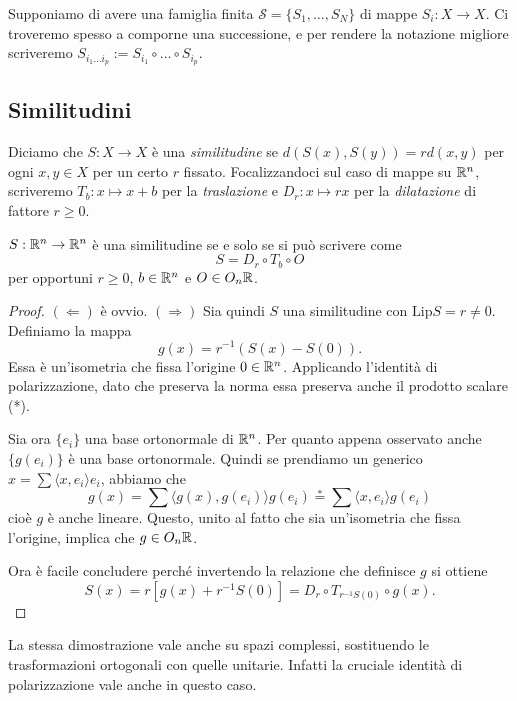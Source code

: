 	Supponiamo di avere una famiglia finita $\mathcal S = \{S_{1},\dots, S_{N}\}$ di mappe $S_{i}:X\to X$. Ci troveremo spesso a comporne una successione, e per rendere la notazione migliore scriveremo $S_{i_{1}\dots i_{p}} := S_{i_{1}}\circ \dots \circ S_{i_{p}}$.


\subsection{Similitudini}

	Diciamo che $S:X\to X$ è una \emph{similitudine} se $d(S(x), S(y)) = rd(x,y)$ per ogni $x,y\in X$ per un certo $r$ fissato. Focalizzandoci sul caso di mappe su $\mathbb{R}^{n}$, scriveremo $T_{b}: x\mapsto x + b$ per la \emph{traslazione} e $D_{r}: x\mapsto rx$ per la \emph{dilatazione} di fattore $r\geq0$.
	
\begin{proposizione}
	$S:\mathbb{R}^{n}\to\mathbb{R}^{n}$ è una similitudine se e solo se si può scrivere come $$S = D_{r}\circ T_{b}\circ O$$ per opportuni $r\geq0$, $b\in\mathbb{R}^{n}$ e $O\in O_{n}\mathbb{R}$.
\end{proposizione}
\begin{proof}
	$(\Leftarrow)$ è ovvio. 
	$(\Rightarrow)$ Sia quindi $S$ una similitudine con $\text{Lip}S = r \neq 0$. Definiamo la mappa $$g(x) = r^{-1}(S(x)-S(0)).$$
	Essa è un'isometria che fissa l'origine $0\in\mathbb{R}^{n}$. Applicando l'identità di polarizzazione, dato che preserva la norma essa preserva anche il prodotto scalare (*). 
	
	Sia ora $\{e_{i}\}$ una base ortonormale di $\mathbb{R}^{n}$. Per quanto appena osservato anche $\{g(e_{i})\}$ è una base ortonormale. Quindi se prendiamo un generico $x = \sum \langle x, e_{i}\rangle e_{i}$, abbiamo che 
	$$g(x) = \sum\langle g(x),g(e_{i})\rangle g(e_{i}) \overset{*}{=} \sum \langle x, e_{i}\rangle g(e_{i})$$
	cioè $g$ è anche lineare. 
	Questo, unito al fatto che sia un'isometria che fissa l'origine, implica che $g\in O_{n}\mathbb{R}$.
	
	Ora è facile concludere perché invertendo la relazione che definisce $g$ si ottiene
	$$S(x) = r[g(x) + r^{-1}S(0)] = D_{r}\circ T_{r^{-1}S(0)}\circ g (x).$$
\end{proof}

\begin{osservazione}
	La stessa dimostrazione vale anche su spazi complessi, sostituendo le trasformazioni ortogonali con quelle unitarie. Infatti la cruciale identità di polarizzazione vale anche in questo caso.  
\end{osservazione}

